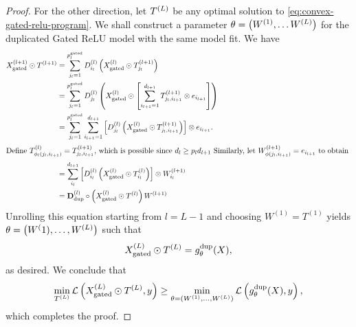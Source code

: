 \begin{proof}
    For the other direction, let \( T^{(L)} \) be any optimal solution
    to \cref{eq:convex-gated-relu-program}.
    We shall construct a parameter \( \theta = \left(W^{(1)}, \ldots W^{(L)}\right) \)
    for the duplicated Gated ReLU model with the same model fit.
    We have
    \begin{align*}
        X^{(l+1)}_{\text{gated}} \odot T^{(l+1)}
         & = \sum_{j_l = 1}^{p_l^{\text{gated}}}
        D^{(l)}_{i_l} \left(X^{(l)}_{\text{gated}} \odot T^{(l+1)}_{j_l}\right)                                     \\
         & = \sum_{j_l = 1}^{p_l^{\text{gated}}}
        D^{(l)}_{j_l} \left(X^{(l)}_{\text{gated}} \odot
        \left[\sum_{i_{l+1}=1}^{d_{l+1}} T^{(l+1)}_{j_l, i_{l+1}} \otimes e_{i_{l+1}}\right]\right) \\
         & = \sum_{j_l = 1}^{p_l^{\text{gated}}}
        \sum_{i_{l+1}=1}^{d_{l+1}} \left[D^{(l)}_{j_l} \left(X^{(l)}_{\text{gated}} \odot
        T^{(l+1)}_{j_l, i_{l+1}}\right)\right] \otimes e_{i_{l+1}}.                                \\
        \intertext{Define \( T^{(l)}_{\phi_l(j_l, i_{l+1})} = T^{(l+1)}_{j_l, i_{l+1}} \),
            which is possible since \( d_l \geq p_l d_{l+1} \)
            Similarly, let \( W^{(l+1)}_{\phi(j_l, i_{l+1})} = e_{i_{l+1}} \) to obtain
        }
         & =\sum_{i_l}^{d_{l+1}} \left[D^{(l)}_{i_l} \left(X^{(l)}_{\text{gated}} \odot
        T^{(l)}_{i_l}\right)\right] \otimes W^{(l+1)}_{i_{l}}                                          \\
         & =\mathbf{D}^{(l)}_{\text{dup}} \circ \left(X^{(l)}_{\text{gated}} \odot
            T^{(l)}\right) W^{(l+1)}
    \end{align*}
    Unrolling this equation starting from \( l = L-1 \) and choosing
    \( W^{(1)} = T^{(1)} \) yields  \( \theta = \left(W^(1), \ldots, W^{(L)}\right) \)
    such that
    \[
        X^{(L)}_{\text{gated}} \odot T^{(L)}
        = g_{\theta}^{\text{dup}}(X),
    \]
    as desired.
    We conclude that
    \[
        \min_{T^{(L)}} \mathcal{L}\left(X^{(L)}_{\text{gated}} \odot T^{(L)}, y\right)
        \geq
        \min_{\theta = (W^{(1)}, \ldots, W^{(L)})} \mathcal{L}\left(g^{\text{dup}}_{\theta}(X), y\right),
    \]
    which completes the proof.
\end{proof}

